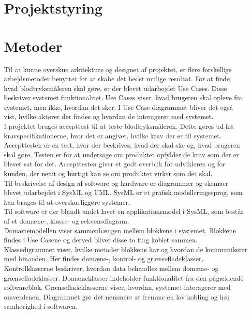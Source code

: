 \section{Projektstyring}

\section{Metoder}
Til at kunne overskue arkitekture og designet af projektet, er flere forskellige arbejdsmetoder benyttet for at skabe det bedst mulige resultat. 
For at finde, hvad blodtryksmåleren skal gøre, er der blevet udarbejdet Use Cases. Disse beskriver systemet funktionalitet. Use Cases viser, hvad brugeren skal opleve fra systemet, men ikke, hvordan det sker. I Use Case diagrammet bliver det også vist, hvilke aktører der findes og hvordan de interagerer med systemet.   \\
I projektet bruges accepttest til at teste blodtryksmåleren. Dette gøres ud fra kravspecifikationerne, hvor det er angivet, hvilke krav der er til systemet. \\Accepttesten er en test, hvor der beskrives, hvad der skal ske og, hvad brugeren skal gøre. Testen er for at undersøge om produktet opfylder de krav som der er blevet sat for det. Accepttesten giver et godt overblik for udvikleren og for kunden, der nemt og hurtigt kan se om produktet virker som det skal. \\
\newline
Til  beskrivelse af design af software og hardware er diagrammer og skemaer blevet udarbejdet i SysML og UML. SysML er et grafisk modelleringssprog, som kan bruges til at overskueliggøre systemer. \\
Til software er der blandt andet lavet en applikationsmodel i SysML, som består af et domæne-, klasse- og sekvensdiagram. \\
Domænemodellen viser sammenhængen mellem blokkene i systemet. Blokkene findes i Use Casene og derved bliver disse to ting koblet sammen. \\
Klassedigrammet viser, hvilke metoder blokkene har og hvordan de kommunikerer med hinanden. Her findes domæne-, kontrol- og grænsefladeklasser. Kontrolklasserne beskriver, hvordan data behandles mellem domæne- og grænsefladeklasser. Domæneklasser indeholder funktionalitet fra den pågældende softwareblok. Grænsefladeklasserne viser, hvordan, systemet interagerer med omverdenen. Diagrammet gør det nemmere at fremme en lav kobling og høj samhørighed i softwaren.\\
